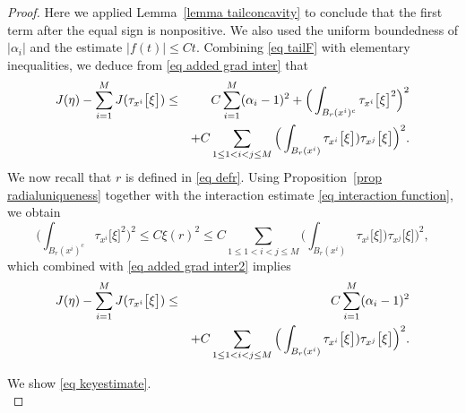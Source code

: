 \documentclass[11pt,letterpaper,reqno]{amsart}
\theoremstyle{plain}%
\theoremstyle{definition}
\numberwithin{equation}{section}
\numberwithin{figure}{section}
\begin{document}
\begin{proof}
Here we applied Lemma~\ref{lemma tailconcavity} to conclude that the first term after the equal sign is nonpositive. We also used the uniform boundedness of $|\alpha_i|$ and the estimate $|f(t)|\le Ct$. Combining \eqref{eq tailF} with elementary inequalities, we deduce from \eqref{eq added grad inter} that
\begin{eqnarray}\notag J(\eta)-\sum_{i=1}^M J(\tau_{x^i}\big[\xi\big]) &\leq& C\sum_{i=1}^M (\alpha_i-1)^2+ \Big(\int_{B_r(x^i)^c} \tau_{x^i}\big[\xi\big]^2 \Big)^2\\\label{eq added grad inter2} &&+ C\sum_{1\leq 1 <i<j\leq M} \Big( \int_{B_r(x^i)} \tau_{x^i}\big[\xi\big])\tau_{x^j}\big[\xi\big]\Big)^2.
\end{eqnarray}
We now recall that $r$ is defined in \eqref{eq defr}. Using Proposition~\ref{prop radialuniqueness} together with the interaction estimate \eqref{eq interaction function}, we obtain
\begin{equation*}
    \Big(\int_{B_r(x^i)^c} \tau_{x^i}\big[\xi\big]^2 \Big)^2\leq C\xi(r)^2 \leq C\sum_{1\leq 1 <i<j\leq M} \Big( \int_{B_r(x^i)} \tau_{x^i}\big[\xi\big])\tau_{x^j}\big[\xi\big]\Big)^2,
\end{equation*}
which combined with \eqref{eq added grad inter2} implies 
\begin{eqnarray}\notag
J(\eta)-\sum_{i=1}^M J(\tau_{x^i}\big[\xi\big]) &\leq& C\sum_{i=1}^M (\alpha_i-1)^2\\\label{eq added grad inter22} 
&&+ C\sum_{1\leq 1 <i<j\leq M} \Big( \int_{B_r(x^i)} \tau_{x^i}\big[\xi\big])\tau_{x^j}\big[\xi\big]\Big)^2.
\end{eqnarray}

\medskip

 We show \eqref{eq keyestimate}.\\


\end{proof}
\end{document}
